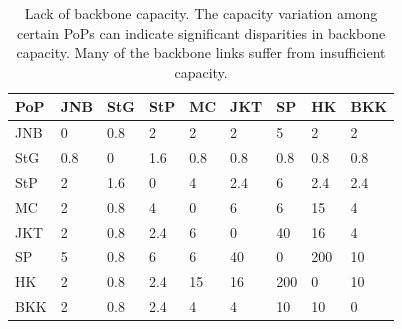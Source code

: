 \begin{table}[t]
\centering
\begin{tabularx} {0.480\textwidth} {|X|X|X|X|X|X|X|X|X|}
 \hline
PoP & JNB & StG & StP & MC & JKT & SP & HK & BKK \\\hline
JNB & 0 & 0.8 & 2 & 2 & 2 & 5 & 2 & 2 \\\hline
StG & 0.8 & 0 & 1.6 & 0.8 & 0.8 & 0.8 & 0.8 & 0.8 \\\hline
StP & 2 & 1.6 & 0 & 4 & 2.4 & 6 & 2.4 & 2.4 \\\hline
MC & 2 & 0.8 & 4 & 0 & 6 & 6 & 15 & 4 \\\hline
JKT & 2 & 0.8 & 2.4 & 6 & 0 & 40 & 16 & 4 \\\hline
SP & 5 & 0.8 & 6 & 6 & 40 & 0 & 200 & 10 \\\hline
HK & 2 & 0.8 & 2.4 & 15 & 16 & 200 & 0 & 10 \\\hline
BKK & 2 & 0.8 & 2.4 & 4 & 4 & 10 & 10 & 0 \\\hline
\end{tabularx}
\caption{\label{tab:backbone-lack} Lack of backbone capacity. The capacity variation among certain PoPs can indicate significant disparities in backbone capacity. Many of the backbone links suffer from insufficient capacity.}
\end{table}


